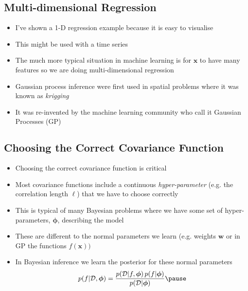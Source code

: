\begin{slide}
\section{Multi-dimensional Regression}

\begin{PauseHighLight}
  \begin{itemize}
  \item I've shown a 1-D regression example because it is easy to
    visualise\pause
  \item This might be used with a time series\pause
  \item The much more typical situation in machine learning is for
    $\bm{x}$ to have many features so we are doing multi-dimensional
    regression\pause
  \item Gaussian process inference were first used in spatial problems
    where it was known as \emph{krigging}\pause
  \item It was re-invented by the machine learning community who call it
    Gaussian Processes (GP)\pause
  \end{itemize}
\end{PauseHighLight}

\end{slide}


\Outline %

\begin{slide}
\section[-2]{Choosing the Correct Covariance Function}

\begin{PauseHighLight}
  \begin{itemize}
  \item Choosing the correct covariance function is critical\pause
  \item Most covariance functions include a continuous
    \emph{hyper-parameter} (e.g. the correlation length $\ell$) that we
    have to choose correctly\pause
  \item This is typical of many Bayesian problems where we have some set
    of hyper-parameters, $\bm{\phi}$, describing the model\pause
  \item These are different to the normal parameters we learn
    (e.g. weights $\bm{w}$ or in GP the functions $f(\bm{x}))$\pause
  \item In Bayesian inference we learn the posterior for these normal
    parameters 
    \begin{align*}
      p(f|\mathcal{D},\bm{\phi}) =
      \frac{p(\mathcal{D}| f, \bm{\phi})\, p(f|\bm{\phi})}
      {p(\mathcal{D}|\bm{\phi})}\pause
    \end{align*}
  \end{itemize}
\end{PauseHighLight}

\end{slide}

